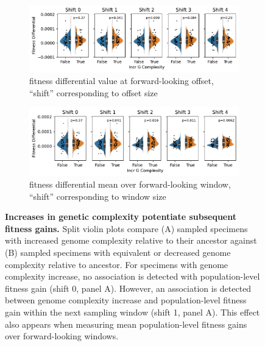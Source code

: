\begin{figure}

\begin{subfigure}{\linewidth}

\includegraphics[width=\linewidth]{binder-2025-08-28-complexity-adaptation/binder/teeplots/2025-08-28-complexity-adaptation/how=shift+sign=-1+viz=subplots+ext=.pdf}
\caption{fitness differential value at forward-looking offset, ``shift'' corresponding to offset size}

\end{subfigure}

\vspace{2ex}

\begin{subfigure}{\linewidth}

\includegraphics[width=\linewidth]{binder-2025-08-28-complexity-adaptation/binder/teeplots/2025-08-28-complexity-adaptation/how=rollingmean+sign=-1+viz=subplots+ext=.pdf}
\caption{fitness differential mean over forward-looking window, ``shift'' corresponding to window size}

\end{subfigure}

\vspace{1ex}

\caption{
\textbf{Increases in genetic complexity potentiate subsequent fitness gains.}
Split violin plots compare (A) sampled specimens with increased genome complexity relative to their ancestor against (B) sampled specimens with equivalent or decreased genome complexity relative to ancestor.
For specimens with genome complexity increase, no association is detected with population-level fitness gain (shift 0, panel A). However, an association is detected between genome complexity increase and population-level fitness gain within the next sampling window (shift 1, panel A). This effect also appears when measuring mean population-level fitness gains over forward-looking windows.
}
\label{fig:potentiate}

\end{figure}
